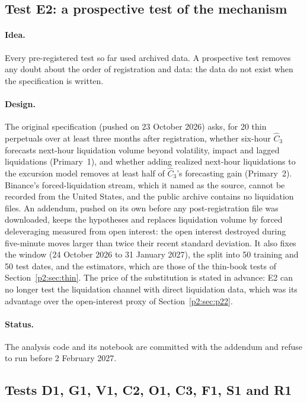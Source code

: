 \subsection{Test E2: a prospective test of the mechanism}\label{sec:ev_e2}

\paragraph{Idea.} Every pre-registered test so far used archived data. A prospective test removes any doubt about the order of registration and data: the data do not exist when the specification is written.

\paragraph{Design.} The original specification (pushed on 23 October 2026) asks, for 20 thin perpetuals over at least three months after registration, whether six-hour $\hat C_3$ forecasts next-hour liquidation volume beyond volatility, impact and lagged liquidations (Primary~1), and whether adding realized next-hour liquidations to the excursion model removes at least half of $\hat C_3$'s forecasting gain (Primary~2). Binance's forced-liquidation stream, which it named as the source, cannot be recorded from the United States, and the public archive contains no liquidation files. An addendum, pushed on its own before any post-registration file was downloaded, keeps the hypotheses and replaces liquidation volume by forced deleveraging measured from open interest: the open interest destroyed during five-minute moves larger than twice their recent standard deviation. It also fixes the window (24 October 2026 to 31 January 2027), the split into 50 training and 50 test dates, and the estimators, which are those of the thin-book tests of Section~\ref{p2:sec:thin}. The price of the substitution is stated in advance: E2 can no longer test the liquidation channel with direct liquidation data, which was its advantage over the open-interest proxy of Section~\ref{p2:sec:p22}.

\paragraph{Status.} The analysis code and its notebook are committed with the addendum and refuse to run before 2 February 2027.

\subsection{Tests D1, G1, V1, C2, O1, C3, F1, S1 and R1}\label{sec:ev_more}

